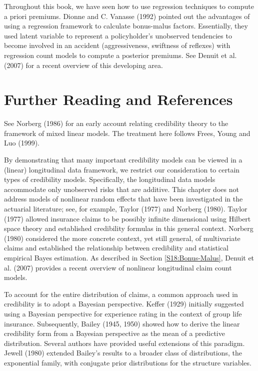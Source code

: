 Throughout this book, we have seen how to use regression techniques
to compute a priori premiums. Dionne and C. Vanasse (1992) pointed
out the advantages of using a regression framework to calculate
bonus-malus factors. Essentially, they used latent variable to
represent a policyholder's unobserved tendencies to become involved
in an accident (aggressiveness, swiftness of reflexes) with
regression count models to compute a posterior premiums. See Denuit
et al. (2007) for a recent overview of this developing area.





\section{Further Reading and References}

See Norberg (1986) for an early account relating credibility theory
to the framework of mixed linear models. The treatment here follows
Frees, Young and Luo (1999).

By demonstrating that many important credibility models can be
viewed in a (linear) longitudinal data framework, we restrict our
consideration to certain types of credibility models. Specifically,
the longitudinal data models accommodate only unobserved risks that
are additive. This chapter does not address models of nonlinear
random effects that have been investigated in the actuarial
literature; see, for example, Taylor (1977) and Norberg (1980).
Taylor (1977) allowed insurance claims to be possibly infinite
dimensional using Hilbert space theory and established credibility
formulas in this general context. Norberg (1980) considered the more
concrete context, yet still general, of multivariate claims and
established the relationship between credibility and statistical
empirical Bayes estimation. As described in Section
\ref{S18:Bonus-Malus}, Denuit et al. (2007) provides a recent
overview of nonlinear longitudinal claim count models.

To account for the entire distribution of claims, a common approach
used in credibility is to adopt a Bayesian perspective. Keffer
(1929) initially suggested using a Bayesian perspective for
experience rating in the context of group life insurance.
Subsequently, Bailey (1945, 1950) showed how to derive the linear
credibility form from a Bayesian perspective as the mean of a
predictive distribution. Several authors have provided useful
extensions of this paradigm. Jewell (1980) extended Bailey's results
to a broader class of distributions, the exponential family, with
conjugate prior distributions for the structure variables.


